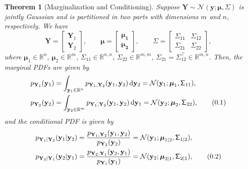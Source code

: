 \documentclass[10pt]{article}
\newtheorem{thm}{Theorem}[section]
\theoremstyle{definition}
\newcommand\eqnum{\addtocounter{equation}{1}\tag{\arabic{section}.\arabic{equation}}}
\DeclareMathOperator{\df}{d\!}
\begin{document}
\begin{thm}[Marginalization and Conditioning]\label{thm:MVN:MC}
Suppose $\mathbf{Y}\sim\mathcal{N}(\mathcal{\mathbf{y}; \boldsymbol{\mu}, \mathsf{\Sigma}})$ is jointly Gaussian and is partitioned in two parts with dimensions $m$ and $n$, respectively. We have
\begin{equation}
\mathbf{Y} =
\begin{bmatrix}
\mathbf{Y}_1 \\
\mathbf{Y}_2
\end{bmatrix}, \qquad
\boldsymbol{\mu} = 
\begin{bmatrix}
\boldsymbol{\mu_1} \\
\boldsymbol{\mu_2}
\end{bmatrix}, \qquad
\mathsf{\Sigma} = 
\begin{bmatrix}
\mathsf{\Sigma_{11}} & \mathsf{\Sigma_{12}} \\
\mathsf{\Sigma_{21}} & \mathsf{\Sigma_{22}}
\end{bmatrix},
\end{equation}
where $\boldsymbol{\mu}_1\in\mathbb{R}^n$, $\boldsymbol{\mu}_2\in\mathbb{R}^m$, $\mathsf{\Sigma}_{11}\in\mathbb{R}^{n,n}$, $\mathsf{\Sigma}_{22}\in\mathbb{R}^{m,m}$, $\mathsf{\Sigma}_{21} = \mathsf{\Sigma}_{12}^{\top}\in\mathbb{R}^{m,n}$. Then, the marginal PDFs are given by
\begin{align*}
p_{\mathbf{Y}_1}(\mathbf{y}_1) &= \int_{\mathbf{y}_1\in\mathbb{R}^n}p_{\mathbf{Y}_1,\mathbf{Y}_2}(\mathbf{y}_1, \mathbf{y}_2)\df \mathbf{y}_2 = \mathcal{N}(\mathbf{y}_1; \boldsymbol{\mu}_1, \mathsf{\Sigma}_{11}), \\
p_{\mathbf{Y}_2}(\mathbf{y}_2) &= \int_{\mathbf{y}_2\in\mathbb{R}^m}p_{\mathbf{Y}_1,\mathbf{Y}_2}(\mathbf{y}_1, \mathbf{y}_2)\df \mathbf{y}_1 = \mathcal{N}(\mathbf{y}_2; \boldsymbol{\mu}_2, \mathsf{\Sigma}_{22}),
\eqnum
\label{eq:MVN:marg}
\end{align*}
and the conditional PDF is given by
\begin{align*}
p_{\mathbf{Y}_1|\mathbf{Y}_2}(\mathbf{y}_1|\mathbf{y}_2) &= 
\frac{p_{\mathbf{Y}_1,\mathbf{Y}_2}(\mathbf{y}_1,\mathbf{y}_2)}{p_{\mathbf{Y}_2}(\mathbf{y}_2)} = \mathcal{N}(\mathbf{y}_1;\boldsymbol{\mu}_{1|2},\mathsf{\Sigma}_{1|2}), \\
p_{\mathbf{Y}_2|\mathbf{Y}_1}(\mathbf{y}_2|\mathbf{y}_1) &= 
\frac{p_{\mathbf{Y}_2,\mathbf{Y}_1}(\mathbf{y}_2,\mathbf{y}_1)}{p_{\mathbf{Y}_1}(\mathbf{y}_1)} = \mathcal{N}(\mathbf{y}_2;\boldsymbol{\mu}_{2|1},\mathsf{\Sigma}_{2|1}),
\eqnum
\end{align*}

\end{thm}
\end{document}
